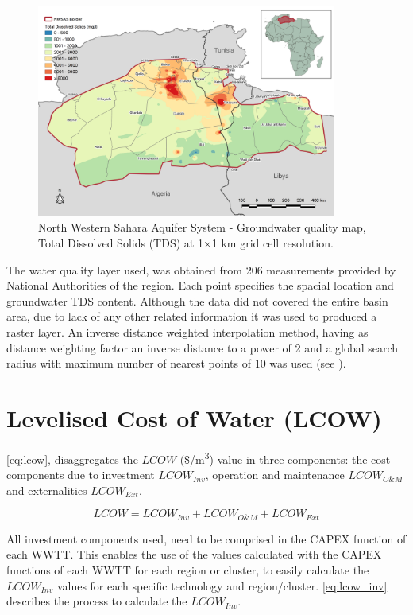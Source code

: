 \documentclass[12pt]{iopart}
\begin{document}
\begin{figure}[!h]
	\centering
	\includegraphics[width=0.88\textwidth, cfbox=black 1pt 0pt]{NWSAS_TDS}
	\caption[NWSAS groundwater quality map - Total Dissolved Solids (TDS)]{North Western Sahara Aquifer System - Groundwater quality map, Total Dissolved Solids (TDS) at 1$\times$1 km grid cell resolution.}
	\label{fig:TDS}
\end{figure}

The water quality layer used, was obtained from 206 measurements provided by National Authorities of the region. Each point specifies the spacial location and groundwater TDS content. Although the data did not covered the entire basin area, due to lack of any other related information it was used to produced a raster layer. An inverse distance weighted interpolation method, having as distance weighting factor an inverse distance to a power of 2 and a global search radius with maximum number of nearest points of 10 was used (see ).

\section{Levelised Cost of Water (LCOW)}
\autoref{eq:lcow}, disaggregates the $LCOW$ (\$/m\textsuperscript{3}) value in three components: the cost components due to investment $LCOW_{Inv}$, operation and maintenance $LCOW_{O\&M}$ and externalities $LCOW_{Ext}$.

\begin{equation}\label{eq:lcow}
LCOW = LCOW_{Inv} + LCOW_{O\&M} + LCOW_{Ext}
\end{equation}

All investment components used, need to be comprised in the CAPEX function of each WWTT. This enables the use of the values calculated with the CAPEX functions of each WWTT for each region or cluster, to easily calculate the $LCOW_{Inv}$ values for each specific technology and region/cluster. \autoref{eq:lcow_inv} describes the process to calculate the $LCOW_{Inv}$.
\end{document}

